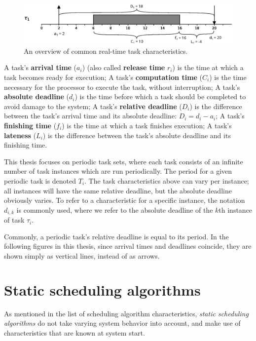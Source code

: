 \documentclass[twoside]{uva-inf-bachelor-thesis}
\begin{document}
\begin{figure}[htpb]
    \centering
    \includegraphics[width=\textwidth]{taskcharacteristics.eps}
    \caption{An overview of common real-time task characteristics.}
    \label{fig:taskcharacteristics}
\end{figure}

\begin{outline}
    \1 A task's \textbf{arrival time} ($a_i$) (also called \textbf{release time} $r_i$) is the time at which a task becomes ready for execution;
    \1 A task's \textbf{computation time} ($C_i$) is the time necessary for the processor to execute the task, without interruption;
    \1 A task's \textbf{absolute deadline} ($d_i$) is the time before which a task should be completed to avoid damage to the system;
    \1 A task's \textbf{relative deadline} ($D_i$) is the difference between the task's arrival time and its absolute deadline: $D_i = d_i - a_i$;
    \1 A task's \textbf{finishing time} ($f_i$) is the time at which a task finishes execution;
    \1 A task's \textbf{lateness} ($L_i$) is the difference between the task's absolute deadline and its finishing time.
\end{outline}

\noindent This thesis focuses on periodic task sets, where each task consists of an infinite number of task instances which are run periodically. The period for a given periodic task is denoted $T_i$. The task characteristics above can vary per instance; all instances will have the same relative deadline, but the absolute deadline obviously varies. To refer to a characteristic for a specific instance, the notation $d_{i,k}$ is commonly used, where we refer to the absolute deadline of the $k$th instance of task $\tau_i$.

Commonly, a periodic task's relative deadline is equal to its period. In the following figures in this thesis, since arrival times and deadlines coincide, they are shown simply as vertical lines, instead of as arrows.

\section{Static scheduling algorithms}
As mentioned in the list of scheduling algorithm characteristics, \emph{static scheduling algorithms} do not take varying system behavior into account, and make use of characteristics that are known at system start.
\end{document}
